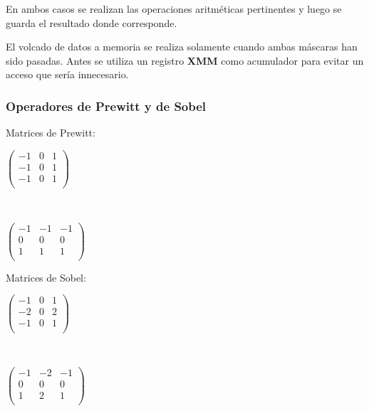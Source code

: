 En ambos casos se realizan las operaciones aritméticas pertinentes y luego se guarda el resultado donde corresponde. 

El volcado de datos a memoria se realiza solamente cuando ambas máscaras han sido pasadas. Antes se utiliza un registro \textbf{XMM} como acumulador para evitar un acceso que sería innecesario.


\subsubsection{Operadores de Prewitt y de Sobel}

Matrices de Prewitt:

\begin{center}
\begin{minipage}{0.30 \textwidth}
$\begin{pmatrix}
-1 & 0 & 1 \\
-1 & 0 & 1 \\
-1 & 0 & 1 \\
\end{pmatrix}$
\end{minipage}
\ \ 
 \begin{minipage}{0.30 \textwidth}
$\begin{pmatrix}
-1 & -1 & -1 \\
0 & 0 & 0  \\
1 & 1 & 1 \\
\end{pmatrix}$
\end{minipage}
\end{center}

Matrices de Sobel:

\begin{center}
\begin{minipage}{0.30 \textwidth}
$\begin{pmatrix}
-1 & 0 & 1 \\
-2 & 0 & 2 \\
-1 & 0 & 1 \\
\end{pmatrix}$
\end{minipage}
\ \ 
 \begin{minipage}{0.30 \textwidth}
$\begin{pmatrix}
-1 & -2 & -1 \\
0 & 0 & 0  \\
1 & 2 & 1 \\
\end{pmatrix}$
\end{minipage}
\end{center}

